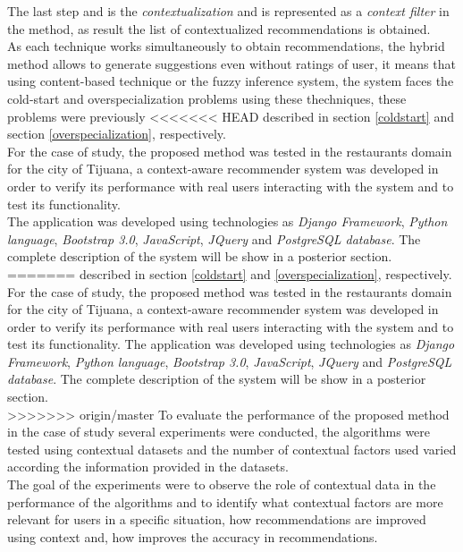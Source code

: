 The last step and is the \textit{contextualization} and is
represented as a \textit{context filter} in the method, as result the
list of contextualized recommendations is obtained. \\ As each
technique works simultaneously to obtain recommendations, the hybrid
method allows to generate suggestions even without  ratings of user,
it means that using content-based technique or the fuzzy inference system, 
the system faces the cold-start and overspecialization
problems using these thechniques, these problems were previously
<<<<<<< HEAD
described in section  \ref{coldstart} and  
section  \ref{overspecialization}, respectively.\\ 
For the case of study, the proposed method was tested in the 
restaurants domain for the city of Tijuana, a context-aware 
recommender system  was developed  in order to verify its 
performance with real users interacting with  the system and to
test  its functionality. \\  The application was developed using
technologies as \textit{Django Framework}, \textit{Python language}, 
\textit{Bootstrap 3.0}, \textit{JavaScript}, \textit{JQuery} and  
\textit{PostgreSQL database}. The complete description of the 
system will be show in a posterior section.\\ 
=======
described in section \ref{coldstart} and \ref{overspecialization},
respectively.\\ 
For the case of study, the proposed method was tested in the restaurants
domain for the city of Tijuana, a context-aware recommender system 
was developed 
in order to verify its performance with real users interacting with 
the system and to
test  its functionality.  The application was developed using
technologies as \textit{Django Framework}, \textit{Python language}, 
\textit{Bootstrap 3.0},
\textit{JavaScript}, \textit{JQuery} and  \textit{PostgreSQL database}. 
The complete description of the system will be show in a posterior section.\\ 
>>>>>>> origin/master
To evaluate the performance of the proposed method in
the case of study several experiments were conducted, the algorithms
were tested using  contextual datasets and the number of contextual
factors used varied  according the information provided in the
datasets. \\ The goal of the  experiments were to observe the role of
contextual data  in the performance of the algorithms and to
identify what contextual factors are more relevant for users in a
specific situation, how recommendations are improved using context
and, how improves the accuracy in recommendations.

